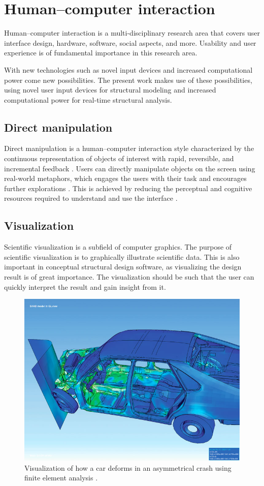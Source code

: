 \chapter{Human--computer interaction}
\label{ch:Human-computer interaction}
Human--computer interaction is a multi-disciplinary research area that covers user interface design, hardware, software, social aspects, and more. Usability and user experience is of fundamental importance in this research area.

With new technologies such as novel input devices and increased computational power come new possibilities. The present work makes use of these possibilities, using novel user input devices for structural modeling and increased computational power for real-time structural analysis. 

\section{Direct manipulation}
Direct manipulation is a human--computer interaction style characterized by the continuous representation of objects of interest with rapid, reversible, and incremental feedback \cite{Shneiderman1982}. Users can directly manipulate objects on the screen using real-world metaphors, which engages the users with their task and encourages further explorations \cite{Shneiderman:1997:DMC:238218.238281}. This is achieved by reducing the perceptual and cognitive resources required to understand and use the interface \cite{Sears1990}.

\section{Visualization}
Scientific visualization is a subfield of computer graphics. The purpose of scientific visualization is to graphically illustrate scientific data. This is also important in conceptual structural design software, as visualizing the design result is of great importance. The visualization should be such that the user can quickly interpret the result and gain insight from it. 

\begin{figure}
  \includegraphics[width=320pt]{graphics/car.jpg}
  \caption{Visualization of how a car deforms in an asymmetrical crash using finite element analysis \cite{impact}.}
  \label{fig:Car}
\end{figure}

